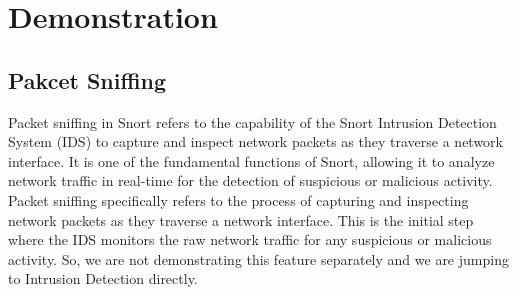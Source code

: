 \documentclass{article}
\begin{document}
\section{Demonstration}
\label{sec:Demonstration}
\subsection{Pakcet Sniffing}
 Packet sniffing in Snort refers to the capability of the Snort Intrusion Detection System (IDS) to capture and inspect network packets as they traverse a network interface. It is one of the fundamental functions of Snort, allowing it to analyze network traffic in real-time for the detection of suspicious or malicious activity. Packet sniffing specifically refers to the process of capturing and inspecting network packets as they traverse a network interface. This is the initial step where the IDS monitors the raw network traffic for any suspicious or malicious activity. So, we are not demonstrating this feature separately and we are jumping to Intrusion Detection directly.
\end{document}
